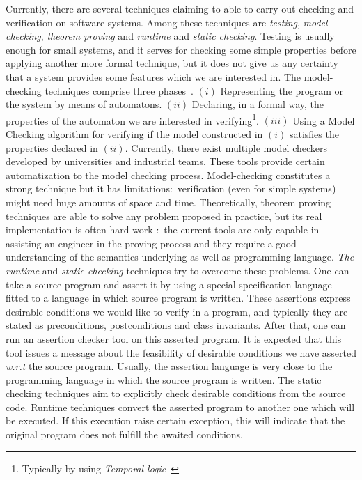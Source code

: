 \documentclass[a4paper]{llncs}
\newcommand{\ctl}{\textsc{Ctl}}
\newcommand{\pltl}{\textsc{Pltl}}
\begin{document}
Currently, there are several techniques claiming to able to carry out
checking and
verification on software systems. Among these techniques are
\textit{testing}, \textit{model-checking}, \textit{theorem
proving} and \textit{runtime} and \textit{static checking}. Testing
is usually enough
for small systems, and it serves for checking some simple properties
before applying another more formal technique, but it does not give
us any certainty that a system provides some features which we are
interested in. The model-checking techniques comprise three
phases~\cite{BBLPS99}. $(i)$ Representing the program or the system
by means of automatons. 
$(ii)$ Declaring, in a formal way, the properties of the automaton we are
interested in verifying\footnote{Typically by using
\textit{Temporal logic}~\cite{Pnue77}}. 
$(iii)$ Using a Model Checking algorithm for
verifying if the model constructed in $(i)$ satisfies the properties
declared in $(ii)$. Currently, there exist multiple model checkers
developed by universities and industrial teams. These tools provide certain
automatization to the model checking process. Model-checking
constitutes a strong technique
but it has limitations$:$ verification (even for simple systems) might
need huge amounts of space and time. Theoretically,
theorem proving techniques are able to solve any problem proposed in
practice, but its real implementation is often hard work
$:$ the current tools are only capable in assisting an
engineer in the proving process and they require a good understanding 
of the semantics underlying as well as programming language. 
\textit{The runtime} and \textit{static checking} techniques try to
overcome
these problems. One can take a source program and
assert it by using a special specification language fitted to a
language in which source program is written. These assertions express
desirable conditions we would like to verify in a program, and
typically they are stated as
preconditions, postconditions and class invariants. After that, one
can run an assertion checker tool on this asserted program. It is
expected that this tool issues a message about the feasibility of
desirable conditions we have asserted
\emph{w.r.t} the source program. Usually, the assertion language is 
very close to the programming language in which the source program is
written. The static checking techniques aim to explicitly check
desirable conditions from the source code. Runtime techniques
convert the asserted program to another one which will be executed. If 
this execution raise certain exception, this will indicate that the
original program does not fulfill the awaited conditions.
\end{document}
